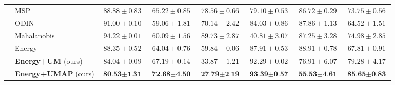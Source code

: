 \documentclass{article}
\theoremstyle{plain}
\theoremstyle{definition}
\theoremstyle{remark}
\begin{document}
\begin{table}[t!]
{\begin{tabular}{c|l|cccccc}
        \cmidrule{2-8}
         & MSP & $88.88\pm0.83$ & $65.22\pm0.85$ & $78.56\pm0.66$ & $79.10\pm0.53$ & $86.72\pm0.29$ & $73.75\pm0.56$\\
         & ODIN & $91.00\pm0.10$ & $59.06\pm1.81$ & $70.14\pm2.42$ & $84.03\pm0.86$ & $87.86\pm1.13$ & $64.52\pm1.51$\\
         & Mahalanobis & $94.22\pm0.01$ & $60.09\pm1.56$ & $89.73\pm2.87$ & $40.81\pm3.07$ & $87.25\pm3.28$ & $74.98\pm2.85$\\
         & Energy & $88.35\pm0.52$ & $64.04\pm0.76$ & $59.84\pm0.06$ & $87.91\pm0.53$ & $88.91\pm0.78$ & $67.81\pm0.91$\\
         & \textbf{Energy+UM} (ours) & $84.04\pm0.09$ & $67.19\pm0.14$ & $33.87\pm1.21$ & $92.29\pm0.02$ & $76.91\pm6.07$ & $79.28\pm4.17$\\
         & \textbf{Energy+UMAP} (ours) & $\textbf{80.53}\pm\textbf{1.31}$ & $\textbf{72.68}\pm\textbf{4.50}$ & $\textbf{27.79}\pm\textbf{2.19}$ & $\textbf{93.39}\pm\textbf{0.57}$ & $\textbf{55.53}\pm\textbf{4.61}$ & $\textbf{85.65}\pm\textbf{0.83}$\\
         
        \bottomrule[1.5pt]
    \end{tabular}}
    \label{tab:label_wrn_zoom_in_cifar100}
\end{table}
\end{document}
